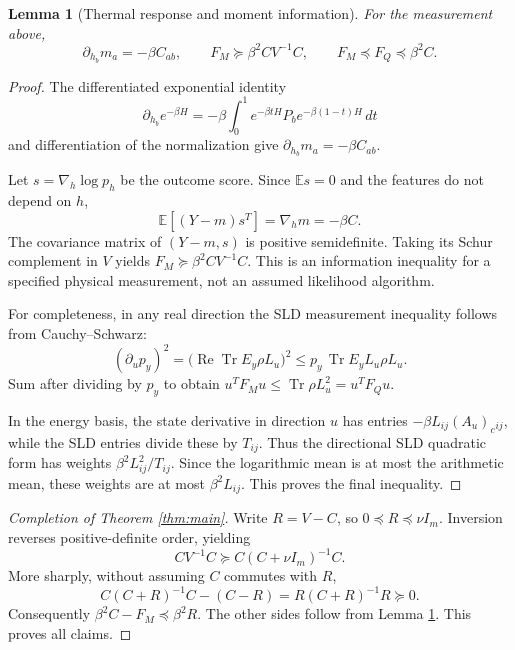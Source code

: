 \documentclass[11pt,a4paper]{article}
\newtheorem{lemma}[theorem]{Lemma}
\theoremstyle{remark}
\newcommand{\Tr}{\operatorname{Tr}}
\newcommand{\E}{\mathbb E}
\begin{document}
\begin{lemma}[Thermal response and moment information]\label{lem:info}
For the measurement above,
\begin{equation}
 \partial_{h_b}m_a=-\beta C_{ab},\qquad
 F_M\succeq\beta^2CV^{-1}C,
 \qquad F_M\preceq F_Q\preceq\beta^2C.
 \label{eq:infolemma}
\end{equation}
\end{lemma}
\begin{proof}
The differentiated exponential identity
\[
 \partial_{h_b}e^{-\beta H}
 =-\beta\int_0^1 e^{-\beta tH}P_b e^{-\beta(1-t)H}\,dt
\]
and differentiation of the normalization give $\partial_{h_b}m_a=-\beta C_{ab}$.

Let $s=\nabla_h\log p_h$ be the outcome score. Since $\E s=0$ and the features do not depend on $h$,
\[
 \E[(Y-m)s^T]=\nabla_hm=-\beta C.
\]
The covariance matrix of $(Y-m,s)$ is positive semidefinite. Taking its Schur complement in $V$ yields $F_M\succeq\beta^2CV^{-1}C$. This is an information inequality for a specified physical measurement, not an assumed likelihood algorithm.

For completeness, in any real direction the SLD measurement inequality follows from Cauchy--Schwarz:
\[
 (\partial_u p_y)^2=
 \big(\operatorname{Re}\Tr E_y\rho L_u\big)^2
 \le p_y\,\Tr E_y L_u\rho L_u.
\]
Sum after dividing by $p_y$ to obtain $u^TF_Mu\le\Tr\rho L_u^2=u^TF_Qu$.

In the energy basis, the state derivative in direction $u$ has entries $-\beta L_{ij}(A_u)_c{}_{ij}$, while the SLD entries divide these by $T_{ij}$. Thus the directional SLD quadratic form has weights $\beta^2L_{ij}^2/T_{ij}$. Since the logarithmic mean is at most the arithmetic mean, these weights are at most $\beta^2L_{ij}$. This proves the final inequality.
\end{proof}

\begin{proof}[Completion of Theorem \ref{thm:main}]
Write $R=V-C$, so $0\preceq R\preceq\nu I_m$. Inversion reverses positive-definite order, yielding
\[
 CV^{-1}C\succeq C(C+\nu I_m)^{-1}C.
\]
More sharply, without assuming $C$ commutes with $R$,
\begin{equation}
 C(C+R)^{-1}C-(C-R)=R(C+R)^{-1}R\succeq0.
 \label{eq:algebra}
\end{equation}
Consequently $\beta^2C-F_M\preceq\beta^2R$. The other sides follow from Lemma \ref{lem:info}. This proves all claims.
\end{proof}
\end{document}
